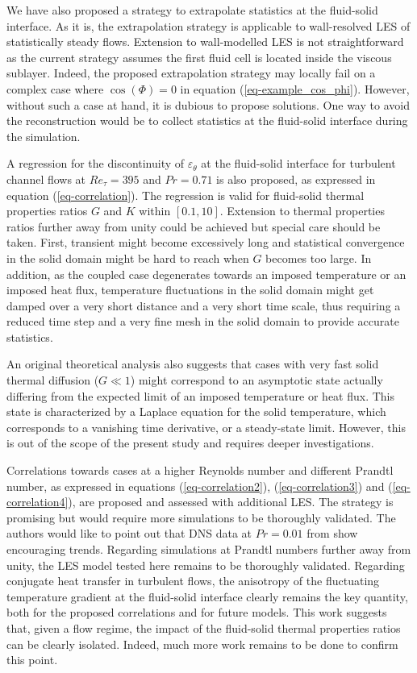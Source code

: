 \documentclass{svjour3}                     %
\begin{document}
We have also proposed a strategy to extrapolate statistics at the fluid-solid interface.
As it is, the extrapolation strategy is applicable to wall-resolved LES of statistically steady flows.
Extension to wall-modelled LES is not straightforward as the current strategy assumes the first fluid cell is located inside the viscous sublayer.
Indeed, the proposed extrapolation strategy may locally fail on a complex case where $\cos \left( \Phi \right) = 0$ in equation (\ref{eq-example_cos_phi}).
However, without such a case at hand, it is dubious to propose solutions.
One way to avoid the reconstruction would be to collect statistics at the fluid-solid interface during the simulation.

A regression for the discontinuity of $\varepsilon_\theta$ at the fluid-solid interface for turbulent channel flows at $Re_\tau=395$ and $Pr=0.71$ is also proposed, as expressed in equation (\ref{eq-correlation}).
The regression is valid for fluid-solid thermal properties ratios $G$ and $K$ within $[0.1,10]$.
Extension to thermal properties ratios further away from unity could be achieved but special care should be taken.
First, transient might become excessively long and statistical convergence in the solid domain might be hard to reach when $G$ becomes too large.
In addition, as the coupled case degenerates towards an imposed temperature or an imposed heat flux, temperature fluctuations in the solid domain might get damped over a very short distance and a very short time scale, thus requiring a reduced time step and a very fine mesh in the solid domain to provide accurate statistics.

An original theoretical analysis also suggests that cases with very fast solid thermal diffusion ($G \ll 1$) might correspond to an asymptotic state actually differing from the expected limit of an imposed temperature or heat flux.
This state is characterized by a Laplace equation for the solid temperature, which corresponds to a vanishing time derivative, or a steady-state limit.
However, this is out of the scope of the present study and requires deeper investigations.

Correlations towards cases at a higher Reynolds number and different Prandtl number, as expressed in equations (\ref{eq-correlation2}), (\ref{eq-correlation3}) and (\ref{eq-correlation4}), are proposed and assessed with additional LES.
The strategy is promising but would require more simulations to be thoroughly validated.
The authors would like to point out that DNS data at $Pr=0.01$ from \cite{tiselj2012dns} show encouraging trends.
Regarding simulations at Prandtl numbers further away from unity, the LES model tested here remains to be thoroughly validated.
Regarding conjugate heat transfer in turbulent flows, the anisotropy of the fluctuating temperature gradient at the fluid-solid interface clearly remains the key quantity, both for the proposed correlations and for future models.
This work suggests that, given a flow regime, the impact of the fluid-solid thermal properties ratios can be clearly isolated.
Indeed, much more work remains to be done to confirm this point.
\end{document}
